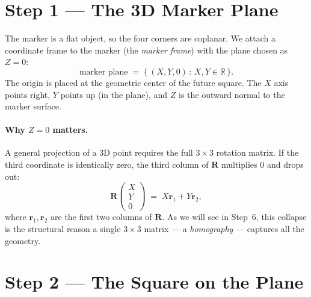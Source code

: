 \documentclass[11pt]{article}
\newcommand{\R}{\mathbb{R}}
\begin{document}
\section{Step 1 --- The 3D Marker Plane}

The marker is a flat object, so the four corners are coplanar. We attach a
coordinate frame to the marker (the \emph{marker frame}) with the plane
chosen as $Z = 0$:
\begin{equation}
  \text{marker plane} \;=\; \{\, (X, Y, 0) \,:\, X, Y \in \R \,\}.
\end{equation}
The origin is placed at the geometric center of the future square. The
$X$ axis points right, $Y$ points up (in the plane), and $Z$ is the outward
normal to the marker surface.

\paragraph{Why $Z = 0$ matters.}
A general projection of a 3D point requires the full $3\times 3$ rotation
matrix. If the third coordinate is identically zero, the third column of
$\mathbf{R}$ multiplies $0$ and drops out:
\begin{equation}
  \mathbf{R} \begin{pmatrix} X \\ Y \\ 0 \end{pmatrix}
  \;=\; X \mathbf{r}_1 + Y \mathbf{r}_2,
\end{equation}
where $\mathbf{r}_1, \mathbf{r}_2$ are the first two columns of $\mathbf{R}$. As we
will see in Step~6, this collapse is the structural reason a single
$3\times 3$ matrix --- a \emph{homography} --- captures all the geometry.

\section{Step 2 --- The Square on the Plane}
\end{document}
